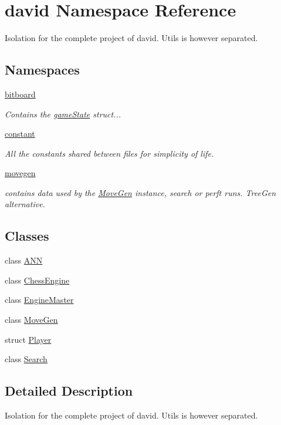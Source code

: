 \hypertarget{namespacedavid}{}\section{david Namespace Reference}
\label{namespacedavid}


Isolation for the complete project of david. Utils is however separated.  


\subsection*{Namespaces}
\begin{DoxyCompactItemize}
\item 
 \hyperlink{namespacedavid_1_1bitboard}{bitboard}
\begin{DoxyCompactList}\small\item\em Contains the \hyperlink{structdavid_1_1bitboard_1_1gameState}{game\+State} struct... \end{DoxyCompactList}\item 
 \hyperlink{namespacedavid_1_1constant}{constant}
\begin{DoxyCompactList}\small\item\em All the constants shared between files for simplicity of life. \end{DoxyCompactList}\item 
 \hyperlink{namespacedavid_1_1movegen}{movegen}
\begin{DoxyCompactList}\small\item\em contains data used by the \hyperlink{classdavid_1_1MoveGen}{Move\+Gen} instance, search or perft runs. Tree\+Gen alternative. \end{DoxyCompactList}\end{DoxyCompactItemize}
\subsection*{Classes}
\begin{DoxyCompactItemize}
\item 
class \hyperlink{classdavid_1_1ANN}{A\+NN}
\item 
class \hyperlink{classdavid_1_1ChessEngine}{Chess\+Engine}
\item 
class \hyperlink{classdavid_1_1EngineMaster}{Engine\+Master}
\item 
class \hyperlink{classdavid_1_1MoveGen}{Move\+Gen}
\item 
struct \hyperlink{structdavid_1_1Player}{Player}
\item 
class \hyperlink{classdavid_1_1Search}{Search}
\end{DoxyCompactItemize}


\subsection{Detailed Description}
Isolation for the complete project of david. Utils is however separated. 